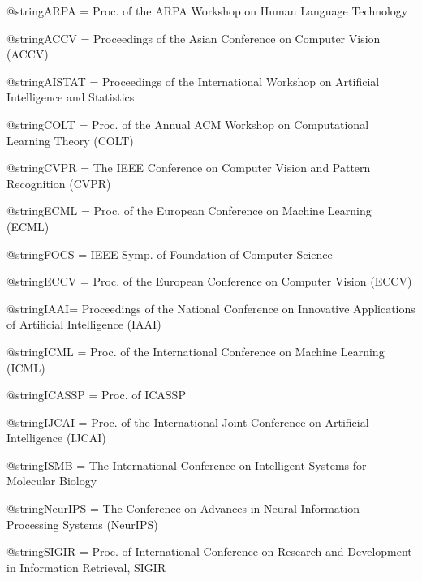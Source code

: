 @string{ARPA = {Proc. of the ARPA Workshop on Human Language Technology}}

@string{ACCV = {Proceedings of the Asian Conference on Computer Vision (ACCV)}}

@string{AISTAT = {Proceedings of the International Workshop on Artificial Intelligence and Statistics}}



@string{COLT = {Proc. of the Annual ACM Workshop on Computational Learning Theory (COLT)}}


@string{CVPR = {The IEEE Conference on Computer Vision and Pattern Recognition (CVPR)}}

@string{ECML = {Proc. of the European Conference on Machine Learning (ECML)}}

@string{FOCS = {IEEE Symp. of Foundation of Computer Science}}

@string{ECCV = {Proc. of the European Conference on Computer Vision (ECCV)}}

@string{IAAI= {Proceedings of the National Conference on Innovative Applications of Artificial Intelligence (IAAI)}}

@string{ICML = {Proc. of the International Conference on Machine Learning (ICML)}}

@string{ICASSP = {Proc. of ICASSP}}

@string{IJCAI = {Proc. of the International Joint Conference on Artificial Intelligence (IJCAI)}}


@string{ISMB = {The International Conference on Intelligent Systems for Molecular Biology}}


@string{NeurIPS = {The Conference on Advances in Neural Information Processing Systems (NeurIPS)}}

@string{SIGIR = {Proc. of International Conference on Research and Development in Information Retrieval, SIGIR}}

